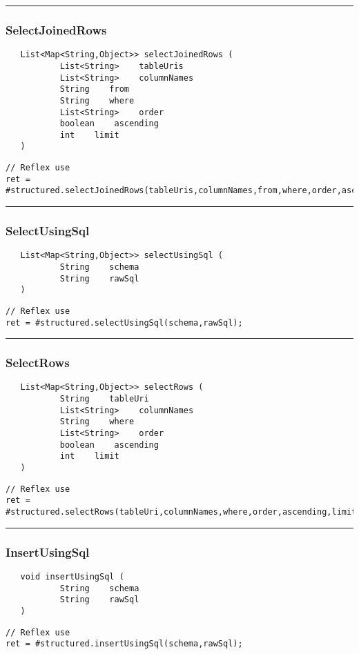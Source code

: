 \rule{15cm}{2pt}
\subsubsection{SelectJoinedRows}
\label{Api:SelectJoinedRows}
\begin{verbatim}
   List<Map<String,Object>> selectJoinedRows (
           List<String>    tableUris
           List<String>    columnNames
           String    from
           String    where
           List<String>    order
           boolean    ascending
           int    limit
   )
\end{verbatim}
\begin{lstlisting}[language=reflex]
// Reflex use
ret = #structured.selectJoinedRows(tableUris,columnNames,from,where,order,ascending,limit);
\end{lstlisting}



\rule{15cm}{2pt}
\subsubsection{SelectUsingSql}
\label{Api:SelectUsingSql}
\begin{verbatim}
   List<Map<String,Object>> selectUsingSql (
           String    schema
           String    rawSql
   )
\end{verbatim}
\begin{lstlisting}[language=reflex]
// Reflex use
ret = #structured.selectUsingSql(schema,rawSql);
\end{lstlisting}



\rule{15cm}{2pt}
\subsubsection{SelectRows}
\label{Api:SelectRows}
\begin{verbatim}
   List<Map<String,Object>> selectRows (
           String    tableUri
           List<String>    columnNames
           String    where
           List<String>    order
           boolean    ascending
           int    limit
   )
\end{verbatim}
\begin{lstlisting}[language=reflex]
// Reflex use
ret = #structured.selectRows(tableUri,columnNames,where,order,ascending,limit);
\end{lstlisting}



\rule{15cm}{2pt}
\subsubsection{InsertUsingSql}
\label{Api:InsertUsingSql}
\begin{verbatim}
   void insertUsingSql (
           String    schema
           String    rawSql
   )
\end{verbatim}
\begin{lstlisting}[language=reflex]
// Reflex use
ret = #structured.insertUsingSql(schema,rawSql);
\end{lstlisting}



